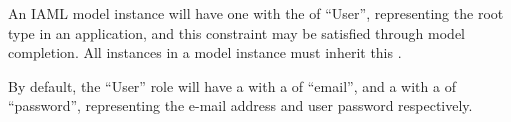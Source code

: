 An IAML model instance will have one  with the  of ``User'', representing the root  type in an application, and this constraint may be satisfied through model completion. All  instances in a model instance must inherit this . 

By default, the ``User'' role will have a  with a  of ``email'', and a  with a  of ``password'', representing the e-mail address and user password respectively.